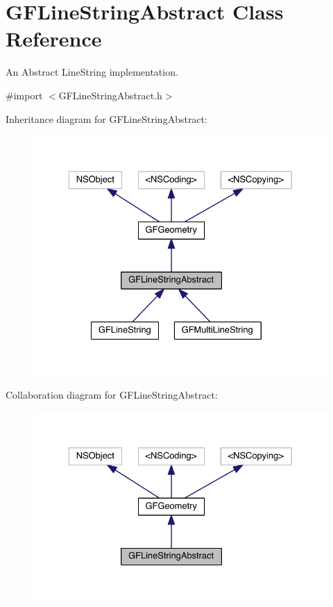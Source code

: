 \hypertarget{interface_g_f_line_string_abstract}{}\section{G\+F\+Line\+String\+Abstract Class Reference}
\label{interface_g_f_line_string_abstract}


An Abstract Line\+String implementation.  




{\ttfamily \#import $<$G\+F\+Line\+String\+Abstract.\+h$>$}



Inheritance diagram for G\+F\+Line\+String\+Abstract\+:\nopagebreak
\begin{figure}[H]
\begin{center}
\leavevmode
\includegraphics[width=329pt]{interface_g_f_line_string_abstract__inherit__graph}
\end{center}
\end{figure}


Collaboration diagram for G\+F\+Line\+String\+Abstract\+:\nopagebreak
\begin{figure}[H]
\begin{center}
\leavevmode
\includegraphics[width=329pt]{interface_g_f_line_string_abstract__coll__graph}
\end{center}
\end{figure}
